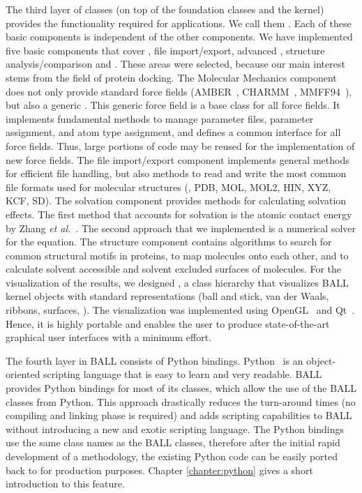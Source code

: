 The third layer of classes (on top of the foundation classes and the kernel)
provides the functionality required for applications. We call them
. Each of these basic components is independent of
the other components.  We have implemented five basic components that cover
, file import/export, advanced , structure analysis/comparison and . These
areas were selected, because our main interest stems from the field of protein
docking. The Molecular Mechanics component does not only provide standard
force fields (AMBER~\cite{AMBER95}, CHARMM~\cite{BBO+83},
MMFF94~\cite{MMFF94a,MMFF94b,MMFF94c,MMFF94d,MMFF94e}), but also a generic
.  This generic force field is a base class for all force
fields. It implements fundamental methods to manage parameter files, parameter
assignment, and atom type assignment, and defines a common interface for all
force fields. Thus, large portions of code may be reused for the
implementation of new force fields.  The file import/export component
implements general methods for efficient file handling, but also methods to
read and write the most common file formats used for molecular structures
(\eg, PDB, MOL, MOL2, HIN, XYZ, KCF, SD). The solvation component provides methods for calculating
solvation effects. The first method that accounts for solvation is the atomic
contact energy by Zhang {\it et al.}~\cite{ZVC+97}. The second approach that
we implemented is a numerical solver for the  equation.  The
structure component contains algorithms to search for common structural motifs
in proteins, to map molecules onto each other, and to calculate solvent
accessible and solvent excluded surfaces of molecules. For the visualization
of the results, we designed , a class hierarchy that
visualizes BALL kernel objects with standard representations (ball and stick,
van der Waals, ribbons, surfaces, \etc). The visualization was implemented
using OpenGL~\cite{OpenGL} and Qt~\cite{QT}. Hence, it is highly portable and 
enables the user to produce state-of-the-art graphical user interfaces with a
minimum effort.

The fourth layer in BALL consists of Python bindings. Python~\cite{Python} is
an object-oriented scripting language that is easy to learn and very readable.
BALL provides Python bindings for most of its classes, which allow the use of
the BALL \CPP classes from Python. This approach drastically reduces the
turn-around times (no compiling and linking phase is required) and adds
scripting capabilities to BALL without introducing a new and exotic scripting
language. The Python bindings use the same class names as the BALL classes,
therefore after the initial rapid development of a methodology, the existing
Python code can be easily ported back to \CPP for production purposes.
Chapter \ref{chapter:python} gives a short introduction to this feature.
